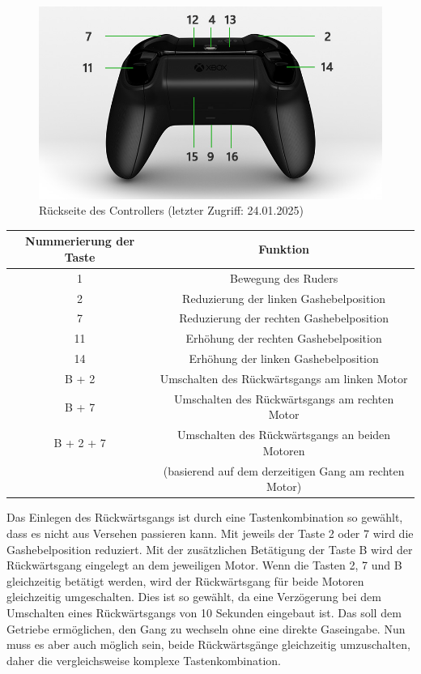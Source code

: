 \begin{figure}[H]
    \centering
    \includegraphics[scale=0.5]{images/rueckseite.jpg}
    \caption{Rückseite des Controllers \cite{XboxController}(letzter Zugriff: 24.01.2025)}
    \label{fig:rueckseite}
\end{figure}

\begin{table}[H]
    \begin{tabular}{|c|c|}
    \hline
    \rowcolor[gray]{0.8}
     Nummerierung der Taste & Funktion \\ \hline 
     1 & Bewegung des Ruders \\ \hline 
     2 & Reduzierung der linken Gashebelposition \\ \hline 
     7 & Reduzierung der rechten Gashebelposition \\ \hline
     11 & Erhöhung der rechten Gashebelposition \\ \hline
     14 & Erhöhung der linken Gashebelposition \\ \hline
     B + 2 & Umschalten des Rückwärtsgangs am linken Motor \\ \hline
     B + 7 & Umschalten des Rückwärtsgangs am rechten Motor \\ \hline
     B + 2 + 7 & Umschalten des Rückwärtsgangs an beiden Motoren \\
      & (basierend auf dem derzeitigen Gang am rechten Motor) \\ \hline
    \end{tabular}
\end{table}
Das Einlegen des Rückwärtsgangs ist durch eine Tastenkombination so gewählt, dass es nicht aus Versehen passieren kann.
Mit jeweils der Taste 2 oder 7 wird die Gashebelposition reduziert. Mit der zusätzlichen Betätigung der Taste B wird der 
Rückwärtsgang eingelegt an dem jeweiligen Motor. Wenn die Tasten 2, 7 und B gleichzeitig betätigt werden, 
wird der Rückwärtsgang für beide Motoren gleichzeitig umgeschalten. Dies ist so gewählt, da eine Verzögerung bei dem
Umschalten eines Rückwärtsgangs von 10 Sekunden eingebaut ist. Das soll dem Getriebe ermöglichen, den Gang zu wechseln
ohne eine direkte Gaseingabe. Nun muss es aber auch möglich sein, beide Rückwärtsgänge gleichzeitig umzuschalten, daher 
die vergleichsweise komplexe Tastenkombination.



